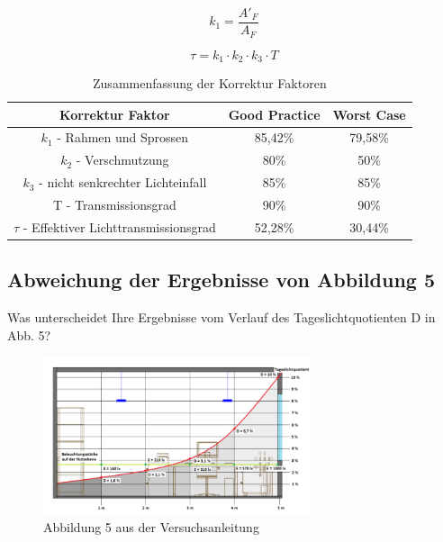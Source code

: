 \begin{equation}
    k_1 = \frac{A'_F}{A_F}
    \label{eq:230624_k1}
\end{equation}

\begin{equation}
    \tau = k_1 \cdot k_2 \cdot k_3 \cdot T
    \label{eq:230624_Lichttransmissionsgrad}
\end{equation}


\begin{table}[H]
    \caption{Zusammenfassung der Korrektur Faktoren}
    \centering
    \begin{tabular}{|c|c|c|}
    \hline
    \rowcolor[HTML]{70AD47} 
    Korrektur Faktor                                & Good Practice & Worst Case \\\hline
    \rowcolor[HTML]{CFE5A8} 
    $k_1$ - Rahmen und Sprossen                     & 85,42\%       & 79,58\%    \\\hline
    \rowcolor[HTML]{A9D08E} 
    $k_2$ - Verschmutzung                           & 80\%          & 50\%       \\\hline
    \rowcolor[HTML]{CFE5A8} 
    $k_3$ - nicht senkrechter Lichteinfall          & 85\%          & 85\%       \\\hline
    \rowcolor[HTML]{A9D08E} 
    T - Transmissionsgrad                           & 90\%          & 90\%       \\\hline
    \rowcolor[HTML]{CFE5A8} 
    $\tau$ - Effektiver Lichttransmissionsgrad      & 52,28\%       & 30,44\%   \\\hline
    \end{tabular}
    \label{tab:230426_Korrektur-Faktoren}
\end{table}

\subsection{Abweichung der Ergebnisse von Abbildung 5}

Was unterscheidet Ihre Ergebnisse vom Verlauf des Tageslichtquotienten D in Abb. 5?
\begin{figure}[H]
    \centering
    \includegraphics[width=0.7\textwidth]{Abbildungen/abb5.png}
    \caption{Abbildung 5 aus der Versuchsanleitung }
    \label{fig:abb5}
\end{figure}

